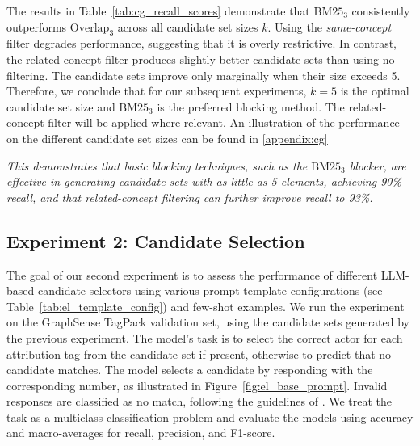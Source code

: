 The results in Table~\ref{tab:cg_recall_scores} demonstrate that $\text{BM25}_3$ consistently outperforms $\text{Overlap}_3$ across all candidate set sizes $k$. Using the \emph{same-concept} filter degrades performance, suggesting that it is overly restrictive. In contrast, the related-concept filter produces slightly better candidate sets than using no filtering. The candidate sets improve only marginally when their size exceeds 5. Therefore, we conclude that for our subsequent experiments, $k=5$ is the optimal candidate set size and $\text{BM25}_3$ is the preferred blocking method. The related-concept filter will be applied where relevant. An illustration of the performance on the different candidate set sizes can be found in \ref{appendix:cg} 

\emph{This demonstrates that basic blocking techniques, such as the $\text{BM25}_3$ blocker, are effective in generating candidate sets with as little as 5 elements, achieving 90\% recall, and that related-concept filtering can further improve recall to 93\%.}


\subsection{Experiment 2: Candidate Selection}
\label{sec:exp2}

The goal of our second experiment is to assess the performance of different LLM-based candidate selectors using various prompt template configurations (see Table~\ref{tab:el_template_config}) and few-shot examples. We run the experiment on the GraphSense TagPack validation set, using the candidate sets generated by the previous experiment. The model's task is to select the correct actor for each attribution tag from the candidate set if present, otherwise to predict that no candidate matches. The model selects a candidate by responding with the corresponding number, as illustrated in Figure~\ref{fig:el_base_prompt}. Invalid responses are classified as no match, following the guidelines of \cite{Narayan2022, Peeters2024}. We treat the task as a multiclass classification problem and evaluate the models using accuracy and macro-averages for recall, precision, and F1-score.

